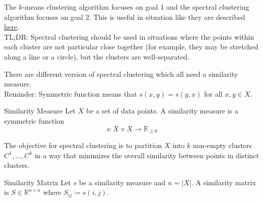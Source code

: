 \documentclass[english]{panikzettel}
\begin{document}
The $k$-means clustering algorithm focuses on goal 1 and the spectral clustering algorithm focuses on goal 2. This is useful in situation like they are described \href{https://towardsdatascience.com/spectral-clustering-82d3cff3d3b7}{here}.\\
TL;DR: Spectral clustering should be used in situations where the points within each cluster are not particular close together (for example, they may be stretched along a line or a circle), but the clusters are well-separated.\\

\begin{halfboxl}
\vspace{-\baselineskip}
	There are different version of spectral clustering which all need a similarity measure.\\
	Reminder: Symmetric function means that $s(x,y)=s(y,x)$ for all $x,y\in X$.
\end{halfboxl}
\begin{halfboxr}
\vspace{-\baselineskip}
	\begin{defi}{Similarity Measure}
	Let $X$ be a set of data points. A similarity measure is a symmetric function
	\[
	s:X\times X\rightarrow\mathbb{R}_{\geq 0}
	\]
	\end{defi}
\end{halfboxr}



\begin{halfboxl}
\vspace{-\baselineskip}
	The objective for spectral clustering is to partition $X$ into $k$ non-empty clusters $C^1,...,C^k$ in a way that minimizes the overall similarity between points in distinct clusters.
\end{halfboxl}
\begin{halfboxr}
\vspace{-\baselineskip}
\begin{defi}{Similarity Matrix}
Let $s$ be a similarity measure and $n=|X|$. A similarity matrix is $S\in\mathbb{R}^{n\times n}$ where $S_{ij}\coloneqq s(i,j)$.
\end{defi}
\end{halfboxr}
\end{document}
